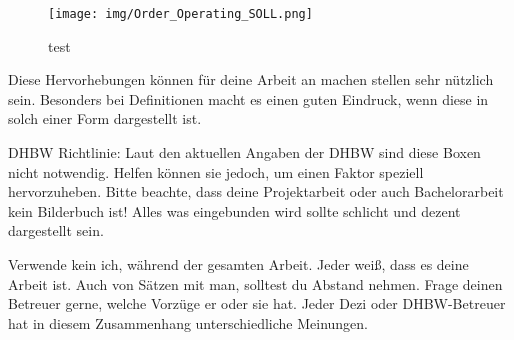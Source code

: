 \begin{figure}[H]
	\centering 
	\texttt{[image: img/Order\_Operating\_SOLL.png]}	\caption[TEST]{\label{fig:logo}test
	}
\end{figure}

\begin{figure}[H]
\centering 

\end{figure}

\begin{figure}[H]
\centering 

\end{figure}

\begin{definitionForm}[Definition]
Diese Hervorhebungen können für deine Arbeit an machen stellen sehr nützlich sein. Besonders bei Definitionen macht es einen guten Eindruck, wenn diese in solch einer Form dargestellt ist. 
\end{definitionForm}

DHBW Richtlinie: Laut den aktuellen Angaben der DHBW sind diese Boxen nicht notwendig. Helfen können sie jedoch, um einen Faktor speziell hervorzuheben. Bitte beachte, dass deine Projektarbeit oder auch Bachelorarbeit kein Bilderbuch ist! Alles was eingebunden wird sollte schlicht und dezent dargestellt sein.

\begin{attentionForm}[Wichtig] Verwende kein \glqq ich\grqq{}, während der gesamten Arbeit. Jeder weiß, dass es deine Arbeit ist. Auch von Sätzen mit \glqq man\grqq{}, solltest du Abstand nehmen. Frage deinen Betreuer gerne, welche Vorzüge er oder sie hat. Jeder Dezi oder DHBW-Betreuer hat in diesem Zusammenhang unterschiedliche Meinungen.
\end{attentionForm}

